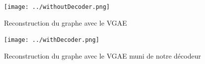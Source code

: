 \documentclass{article}
\begin{document}
\begin{figure}[H]
    \centering
    \texttt{[image: ../withoutDecoder.png]}
    \caption{Reconstruction du graphe avec le VGAE}
    \label{fig:fig_graphe_VGAE}
\end{figure}

\begin{figure}[H]
    \centering
    \texttt{[image: ../withDecoder.png]}
    \caption{Reconstruction du graphe avec le VGAE muni de notre décodeur}
    \label{fig:fig_graphe_VGAE_with_decodeur}
\end{figure}
\end{document}

